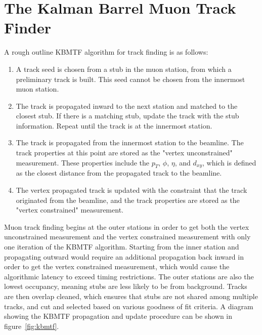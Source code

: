\section{The Kalman Barrel Muon Track Finder} \label{sec:kbmtf}
A rough outline KBMTF algorithm for track finding is as follows:
\begin{enumerate}
	\item A track seed is chosen from a stub in the muon station, from which a preliminary track is built. This seed cannot be chosen from the innermost muon station.
	\item The track is propagated inward to the next station and matched to the closest stub. If there is a matching stub, update the track with the stub information. Repeat until the track is at the innermost station. \label{kbmtf_step2}
	\item The track is propagated from the innermost station to the beamline. The track properties at this point are stored as the "vertex unconstrained" measurement. These properties include the $p_T$, $\phi$, $\eta$, and $d_{xy}$, which is defined as the closest distance from the propagated track to the beamline. \label{kbmtf_step3}
	\item The vertex propagated track is updated with the constraint that the track originated from the beamline, and the track properties are stored as the "vertex constrained" measurement. \label{kbmtf_step4}
\end{enumerate}

Muon track finding begins at the outer stations in order to get both the vertex unconstrained measurement and the vertex constrained measurement with only one iteration of the KBMTF algorithm. Starting from the inner station and propagating outward would require an additional propagation back inward in order to get the vertex constrained measurement, which would cause the algorithmic latency to exceed timing restrictions. The outer stations are also the lowest occupancy, meaning stubs are less likely to be from background. Tracks are then overlap cleaned, which ensures that stubs are not shared among multiple tracks, and cut and selected based on various goodness of fit criteria. A diagram showing the KBMTF propagation and update procedure can be shown in figure~\ref{fig:kbmtf}.

